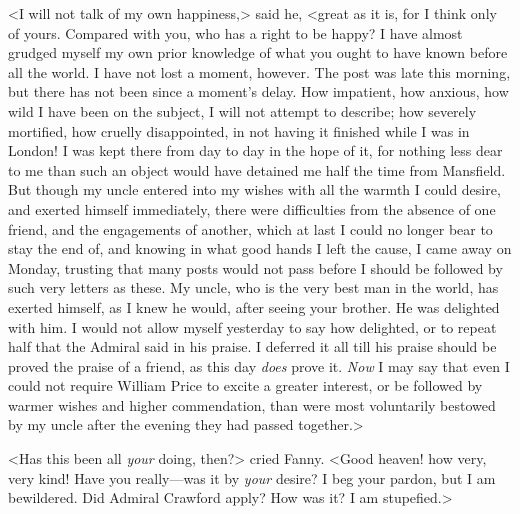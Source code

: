 <I will not talk of my own happiness,> said he, <great as it is, for I think only of yours. Compared with you, who has a right to be happy? I have almost grudged myself my own prior knowledge of what you ought to have known before all the world. I have not lost a moment, however. The post was late this morning, but there has not been since a moment's delay. How impatient, how anxious, how wild I have been on the subject, I will not attempt to describe; how severely mortified, how cruelly disappointed, in not having it finished while I was in London! I was kept there from day to day in the hope of it, for nothing less dear to me than such an object would have detained me half the time from Mansfield. But though my uncle entered into my wishes with all the warmth I could desire, and exerted himself immediately, there were difficulties from the absence of one friend, and the engagements of another, which at last I could no longer bear to stay the end of, and knowing in what good hands I left the cause, I came away on Monday, trusting that many posts would not pass before I should be followed by such very letters as these. My uncle, who is the very best man in the world, has exerted himself, as I knew he would, after seeing your brother. He was delighted with him. I would not allow myself yesterday to say how delighted, or to repeat half that the Admiral said in his praise. I deferred it all till his praise should be proved the praise of a friend, as this day \textit{does}  prove it. \textit{Now}  I may say that even I could not require William Price to excite a greater interest, or be followed by warmer wishes and higher commendation, than were most voluntarily bestowed by my uncle after the evening they had passed together.>

<Has this been all \textit{your}  doing, then?> cried Fanny. <Good heaven! how very, very kind! Have you really—was it by \textit{your}  desire? I beg your pardon, but I am bewildered. Did Admiral Crawford apply? How was it? I am stupefied.>

